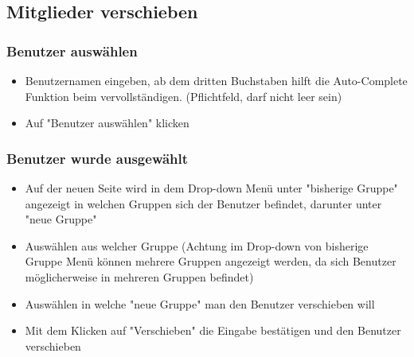 \newpage
\subsection*{Mitglieder verschieben}
\subsubsection*{Benutzer auswählen}
\begin{itemize}
	\item Benutzernamen eingeben, ab dem dritten Buchstaben hilft die Auto-Complete Funktion beim vervollständigen. (Pflichtfeld, darf nicht leer sein)
	\item Auf "Benutzer auswählen" klicken
\end{itemize}
\subsubsection*{Benutzer wurde ausgewählt}
\begin{itemize}
	\item Auf der neuen Seite wird in dem Drop-down Menü unter "bisherige Gruppe" angezeigt in welchen Gruppen sich der Benutzer befindet, darunter unter "neue Gruppe" 
	\item Auswählen aus welcher Gruppe (Achtung im Drop-down von bisherige Gruppe Menü können mehrere Gruppen angezeigt werden, da sich Benutzer möglicherweise in mehreren Gruppen befindet)
	\item Auswählen in welche "neue Gruppe" man den Benutzer verschieben will
	\item Mit dem Klicken auf "Verschieben" die Eingabe bestätigen und den Benutzer verschieben
\end{itemize}


\clearpage